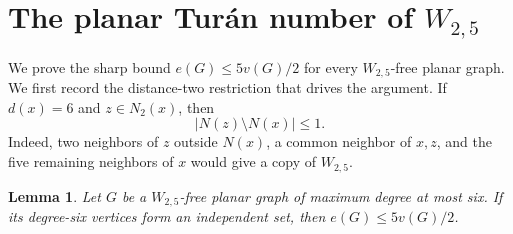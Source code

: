 \documentclass[11pt,a4paper]{article}
\newtheorem{lemma}[theorem]{Lemma}
\theoremstyle{remark}
\begin{document}
\section{The planar Tur\'an number of \texorpdfstring{$W_{2,5}$}{W(2,5)}}\label{sec:w25}

We prove the sharp bound $e(G)\le5v(G)/2$ for every $W_{2,5}$-free planar graph. We first record the distance-two restriction that drives the argument. If $d(x)=6$ and $z\in N_2(x)$, then
\begin{equation}\label{eq:w25-distance-two}
|N(z)\setminus N(x)|\le1.
\end{equation}
Indeed, two neighbors of $z$ outside $N(x)$, a common neighbor of $x,z$, and the five remaining neighbors of $x$ would give a copy of $W_{2,5}$.

\begin{lemma}\label{lem:w25-independent}
Let $G$ be a $W_{2,5}$-free planar graph of maximum degree at most six. If its degree-six vertices form an independent set, then $e(G)\le5v(G)/2$.
\end{lemma}
\end{document}
